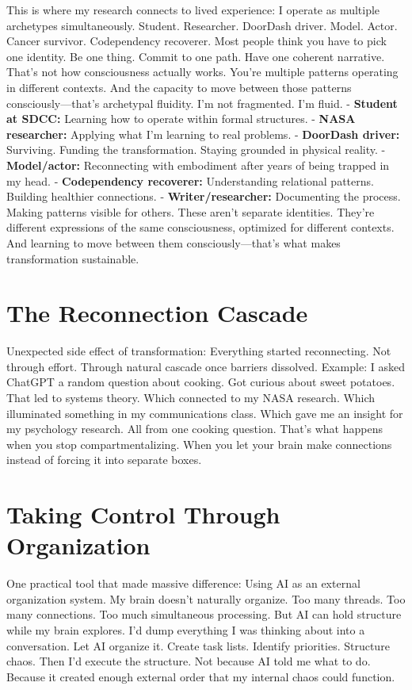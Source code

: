 This is where my research connects to lived experience:
I operate as multiple archetypes simultaneously.
Student. Researcher. DoorDash driver. Model. Actor. Cancer survivor. Codependency recoverer.
Most people think you have to pick one identity.
Be one thing. Commit to one path. Have one coherent narrative.
That's not how consciousness actually works.
You're multiple patterns operating in different contexts. And the capacity to move between those patterns consciously—that's archetypal fluidity.
I'm not fragmented. I'm fluid.
- \textbf{Student at SDCC:} Learning how to operate within formal structures.
- \textbf{NASA researcher:} Applying what I'm learning to real problems.
- \textbf{DoorDash driver:} Surviving. Funding the transformation. Staying grounded in physical reality.
- \textbf{Model/actor:} Reconnecting with embodiment after years of being trapped in my head.
- \textbf{Codependency recoverer:} Understanding relational patterns. Building healthier connections.
- \textbf{Writer/researcher:} Documenting the process. Making patterns visible for others.
These aren't separate identities. They're different expressions of the same consciousness, optimized for different contexts.
And learning to move between them consciously—that's what makes transformation sustainable.

\section{The Reconnection Cascade}

Unexpected side effect of transformation:
Everything started reconnecting.
Not through effort. Through natural cascade once barriers dissolved.
Example:
I asked ChatGPT a random question about cooking. Got curious about sweet potatoes. That led to systems theory. Which connected to my NASA research. Which illuminated something in my communications class. Which gave me an insight for my psychology research.
All from one cooking question.
That's what happens when you stop compartmentalizing. When you let your brain make connections instead of forcing it into separate boxes.

\section{Taking Control Through Organization}

One practical tool that made massive difference:
Using AI as an external organization system.
My brain doesn't naturally organize. Too many threads. Too many connections. Too much simultaneous processing.
But AI can hold structure while my brain explores.
I'd dump everything I was thinking about into a conversation. Let AI organize it. Create task lists. Identify priorities. Structure chaos.
Then I'd execute the structure.
Not because AI told me what to do. Because it created enough external order that my internal chaos could function.

